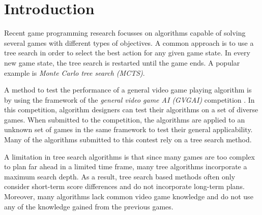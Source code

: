 \section{Introduction}
\label{sec:introduction}


Recent game programming research focusses on algorithms capable of solving
several games with different types of objectives. A common approach is to use a
tree search in order to select the best action for any given game state. In
every new game state, the tree search is restarted until the game ends.  A
popular example is \emph{Monte Carlo tree search (MCTS)}.

A method to test the performance of a general video game playing algorithm is
by using the framework of the \emph{general video game AI (GVGAI)} competition
\cite{perez2014}. In this competition, algorithm designers can test their
algorithms on a set of diverse games. When submitted to the competition, the
algorithms are applied to an unknown set of games in the same framework to test
their general applicability. Many of the algorithms submitted to this contest
rely on a tree search method.

A limitation in tree search algorithms is that since many games are too complex
to plan far ahead in a limited time frame, many tree algorithms incorporate a
maximum search depth. As a result, tree search based methods often only
consider short-term score differences and do not incorporate long-term
plans. Moreover, many algorithms lack common video game knowledge and do not
use any of the knowledge gained from the previous games.

